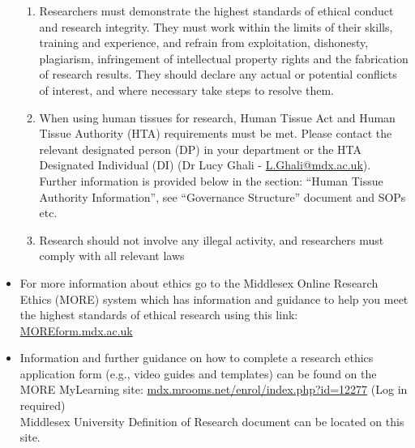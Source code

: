 \documentclass{MDXHandbook}
\begin{document}
\begin{itemize}
\begin{enumerate}
		\item Researchers must demonstrate the highest standards of ethical conduct and research integrity. They must work within the limits of their skills, training and experience, and refrain from exploitation, dishonesty, plagiarism, infringement of intellectual property rights and the fabrication of research results. They should declare any actual or potential conflicts of interest, and where necessary take steps to resolve them. 
		\item When using human tissues for research, Human Tissue Act and Human Tissue Authority (HTA) requirements must be met. Please contact the relevant designated person (DP) in your department or the HTA Designated Individual (DI) (Dr Lucy Ghali - \href{mailto:L.Ghali@mdx.ac.uk}{L.Ghali@mdx.ac.uk}). Further information is provided below in the section: ``Human Tissue Authority Information'', see ``Governance Structure'' document and SOPs etc.
		\item Research should not involve any illegal activity, and researchers must comply with all relevant laws
	\end{enumerate}
	\item For more information about ethics go to the Middlesex Online Research Ethics (MORE) system which has information and guidance to help you meet the highest standards of ethical research using this link: \url{MOREform.mdx.ac.uk}
	\item Information and further guidance on how to complete a research ethics application form (e.g., video guides and templates) can be found on the MORE MyLearning site\textsuperscript{\ast}: \url{mdx.mrooms.net/enrol/index.php?id=12277} (Log in required)\\
\textsuperscript{\ast}Middlesex University Definition of Research document can be located on this site.
\end{itemize}
\end{document}
